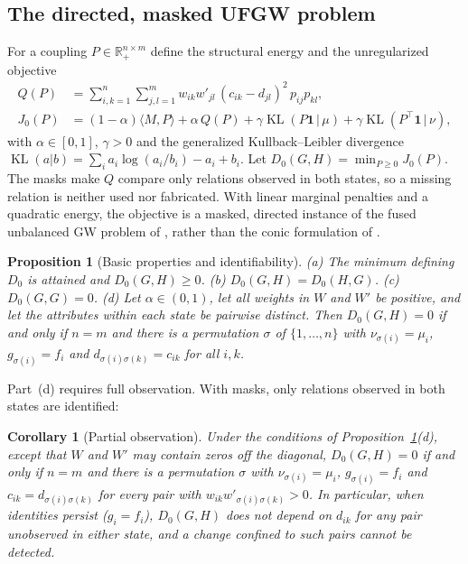 \documentclass[12pt]{article}
\newtheorem{proposition}{Proposition}
\newtheorem{corollary}{Corollary}
\theoremstyle{definition}
\newcommand{\KL}{\operatorname{KL}}
\newcommand{\R}{\mathbb{R}}
\begin{document}
\subsection{The directed, masked UFGW problem}

For a coupling $P\in\R_+^{n\times m}$ define the structural energy and the unregularized objective
\begin{align}
Q(P)&=\sum_{i,k=1}^n\sum_{j,l=1}^m w_{ik}w'_{jl}\,(c_{ik}-d_{jl})^2\,p_{ij}p_{kl}, \label{eq:Q}\\
J_0(P)&=(1-\alpha)\langle M,P\rangle+\alpha\,Q(P)+\gamma\KL(P\mathbf 1\,|\,\mu)+\gamma\KL(P^\top\mathbf 1\,|\,\nu), \label{eq:J0}
\end{align}
with $\alpha\in[0,1]$, $\gamma>0$ and the generalized Kullback--Leibler divergence $\KL(a|b)=\sum_i a_i\log(a_i/b_i)-a_i+b_i$. Let $D_0(G,H)=\min_{P\ge0}J_0(P)$. The masks make $Q$ compare only relations observed in both states, so a missing relation is neither used nor fabricated. With linear marginal penalties and a quadratic energy, the objective is a masked, directed instance of the fused unbalanced GW problem of \citet{thual2022aligning}, rather than the conic formulation of \citet{sejourne2021unbalanced}.

\begin{proposition}[Basic properties and identifiability]\label{prop:basic}
(a) The minimum defining $D_0$ is attained and $D_0(G,H)\ge0$. (b) $D_0(G,H)=D_0(H,G)$. (c) $D_0(G,G)=0$. (d) Let $\alpha\in(0,1)$, let all weights in $W$ and $W'$ be positive, and let the attributes within each state be pairwise distinct. Then $D_0(G,H)=0$ if and only if $n=m$ and there is a permutation $\sigma$ of $\{1,\dots,n\}$ with $\nu_{\sigma(i)}=\mu_i$, $g_{\sigma(i)}=f_i$ and $d_{\sigma(i)\sigma(k)}=c_{ik}$ for all $i,k$.
\end{proposition}

Part~(d) requires full observation. With masks, only relations observed in both states are identified:

\begin{corollary}[Partial observation]\label{cor:mask}
Under the conditions of Proposition~\ref{prop:basic}(d), except that $W$ and $W'$ may contain zeros off the diagonal, $D_0(G,H)=0$ if and only if $n=m$ and there is a permutation $\sigma$ with $\nu_{\sigma(i)}=\mu_i$, $g_{\sigma(i)}=f_i$ and $c_{ik}=d_{\sigma(i)\sigma(k)}$ for every pair with $w_{ik}w'_{\sigma(i)\sigma(k)}>0$. In particular, when identities persist ($g_i=f_i$), $D_0(G,H)$ does not depend on $d_{ik}$ for any pair unobserved in either state, and a change confined to such pairs cannot be detected.
\end{corollary}
\end{document}
